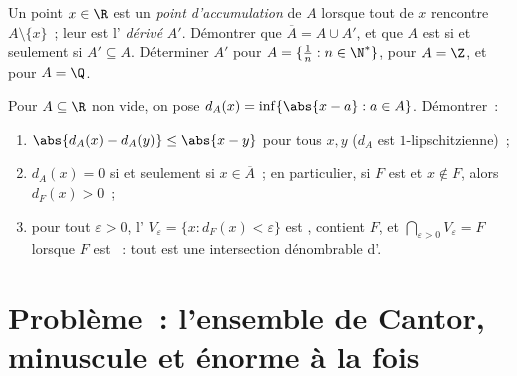 \begin{exercise}[$\star\star$]\label{exo:b1:topology:11}
Un point $x \in \R$ est un \emph{point d'accumulation} de $A$ lorsque
tout  de $x$ rencontre $A \setminus \{x\}$~; leur 
est l'\emph{ dérivé} $A'$. Démontrer que $\overline A = A \cup A'$,
et que $A$ est  si et seulement si $A' \subseteq A$. Déterminer
$A'$ pour $A = \{\frac 1n : n \in \N^*\}$, pour $A = \Z$, et pour
$A = \Q$.
\end{exercise}

\begin{exercise}[$\star\star\star$]\label{exo:b1:topology:12}
Pour $A \subseteq \R$ non vide, on pose $d_A(x) = \inf\{\abs{x - a}
: a \in A\}$. Démontrer~:
\begin{enumerate}
  \item $\abs{d_A(x) - d_A(y)} \leq \abs{x - y}$ pour tous $x, y$
        ($d_A$ est $1$-lipschitzienne)~;
  \item $d_A(x) = 0$ si et seulement si $x \in \overline A$~; en
        particulier, si $F$ est  et $x \notin F$, alors
        $d_F(x) > 0$~;
  \item pour tout $\varepsilon > 0$, l' $V_\varepsilon =
        \{x : d_F(x) < \varepsilon\}$ est , contient $F$, et
        $\bigcap_{\varepsilon > 0} V_\varepsilon = F$ lorsque $F$ est
        ~: tout  est une intersection dénombrable
        d'.
\end{enumerate}
\end{exercise}

\section{Problème~: l'ensemble de Cantor, minuscule et énorme à la fois}


